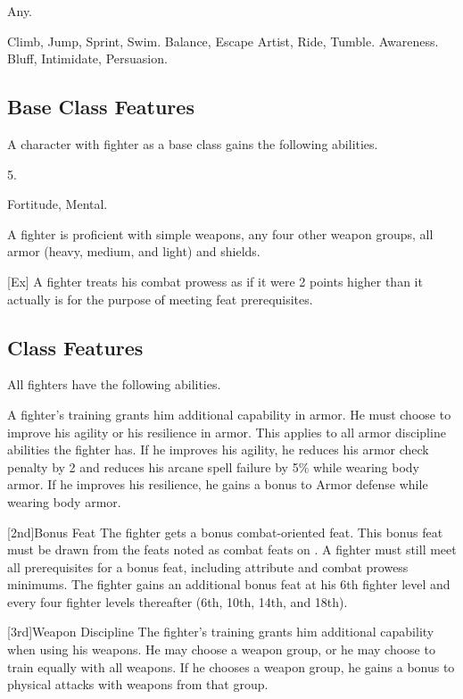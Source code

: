  Any.

 Climb, Jump, Sprint, Swim.
 Balance, Escape Artist, Ride, Tumble.
 Awareness.
 Bluff, Intimidate, Persuasion.

\subsection{Base Class Features}
A character with fighter as a base class gains the following abilities.

 5.

  Fortitude,  Mental.

 A fighter is proficient with simple weapons, any four other weapon groups,  all armor (heavy, medium, and light) and shields.

[Ex]
A fighter treats his combat prowess as if it were 2 points higher than it actually is for the purpose of meeting feat prerequisites.

\subsection{Class Features}
All fighters have the following abilities.

A fighter's training grants him additional capability in armor.
He must choose to improve his agility or his resilience in armor.
This applies to all armor discipline abilities the fighter has.
If he improves his agility, he reduces his armor check penalty by 2 and reduces his arcane spell failure by 5\% while wearing body armor.
If he improves his resilience, he gains a  bonus to Armor defense while wearing body armor.

[2nd]{Bonus Feat}
The fighter gets a bonus combat-oriented feat.
This bonus feat must be drawn from the feats noted as combat feats on .
A fighter must still meet all prerequisites for a bonus feat, including attribute and combat prowess minimums.
The fighter gains an additional bonus feat at his 6th fighter level and every four fighter levels thereafter (6th, 10th, 14th, and 18th).

[3rd]{Weapon Discipline}
The fighter's training grants him additional capability when using his weapons.
He may choose a weapon group, or he may choose to train equally with all weapons.
If he chooses a weapon group, he gains a  bonus to physical attacks with weapons from that group.

